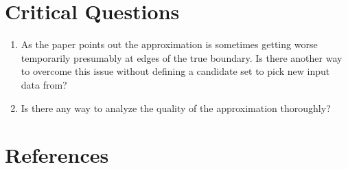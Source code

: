 \documentclass[oneside, notitlepage, twocolumn]{scrartcl}
\begin{document}
\section{Critical Questions}
\begin{enumerate}
    \item As the paper points out the approximation is sometimes getting worse temporarily presumably at edges of the true boundary.
        Is there another way to overcome this issue without defining a candidate set to pick new input data from?
    \item Is there any way to analyze the quality of the approximation thoroughly?
\end{enumerate}

\section{References}
\begingroup
\renewcommand{\section}[2]{}%
\nocite{*}
\printbibliography%
\endgroup
\end{document}
